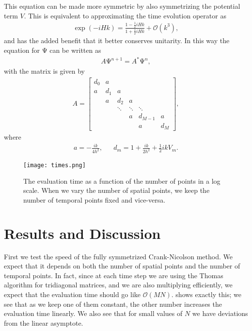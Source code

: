 \documentclass[10pt,a4paper,twocolumn]{article}
\renewcommand{\vec}[1]{\bm{\mathrm{#1}}}
\begin{document}
This equation can be made more symmetric by also symmetrizing the potential term $V$. This is equivalent to approximating the time evolution operator as
%
\begin{align}
    \exp(-i H k) = \frac{1 - \frac{1}{2}i H k}{1 + \frac{1}{2}i H k} + \mathcal{O}(k^3),
\end{align}
%
and has the added benefit that it better conserves unitarity. In this way the equation for $\vec{\Psi}$ can be written as
%
\begin{align}
    A \vec{\Psi}^{n+1} = A^* \vec{\Psi}^n,
\end{align} 
%
with the matrix is given by
%
\begin{align}
    A = 
    \begin{bmatrix}
        d_0 & a \\
        a   & d_1 & a \\
        & a & d_2 & a \\
        & & \ddots & \ddots & \ddots \\
        & & & a & d_{M-1} & a \\
        & & & & a & d_{M}
    \end{bmatrix},
\end{align}
%
where
%
\begin{align}
    &a = - \frac{i k}{4 h^2},& &d_m = 1 + \frac{i k}{2 h^2} + \frac{1}{2} i k V_m.&
\end{align}


\begin{figure}
    \centering
    \captionsetup{justification=centering}
    \texttt{[image: times.png]}
    \caption{The evaluation time as a function of the number of points in a log scale. When we vary the number of spatial points, we keep the number of temporal points fixed and vice-versa.}
    \label{fig:times}
\end{figure}

\section{Results and Discussion}

First we test the speed of the fully symmetrized Crank-Nicolson method. We expect that it depends on both the number of spatial points and the number of temporal points. In fact, since at each time step we are using the Thomas algorithm for tridiagonal matrices, and we are also multiplying efficiently, we expect that the evaluation time should go like $\mathcal{O}(MN)$.  shows exactly this; we see that as we keep one of them constant, the other number increases the evaluation time linearly. We also see that for small values of $N$ we have deviations from the linear asymptote.
\end{document}
